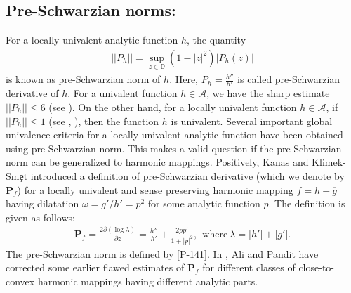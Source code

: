 \documentclass[a4paper,12pt]{amsart}
\theoremstyle{definition}
\newcounter {own}
\begin{document}
	
	

	
	\subsection{Pre-Schwarzian norms:}
	For a locally univalent analytic function $h$, the quantity 
	\begin{align}\label{P-141}
	||P_h|| = \sup_{z \in \mathbb{D}}(1-|z|^2)|P_h(z)|
	\end{align}
	is known as pre-Schwarzian norm of $h.$ Here, $P_h=\frac{h''}{h'}$ is called pre-Schwarzian derivative of $h.$ For a univalent function $h\in\mathcal{A}$, we have the sharp estimate $||P_h||\leq 6$ (see \cite{Kraus-1932}). On the other hand, for a locally univalent function $h\in\mathcal{A}$, if $||P_h||\leq 1$ (see \cite{Becker-1972}, \cite{Becker-Pommerenke-1984}), then the function $h$ is univalent.
	Several important global univalence criteria for a locally univalent analytic function have been obtained using pre-Schwarzian norm. This makes a valid question if the pre-Schwarzian norm can be generalized to harmonic mappings. Positively, Kanas and Klimek-Sm\c{e}t \cite{Kanas-Smet-2014} introduced a definition of pre-Schwarzian derivative (which we denote by $\mathbf{P}_f$) for a locally univalent and sense preserving harmonic mapping $f = h+\overline{g}$ having dilatation $\omega = g'/h'= p^2$ for some analytic function $p$. The definition is given as follows:
	\begin{align}\label{p1-020}
		\mathbf{P}_f= \frac{2\partial(\log\lambda)}{\partial z}= \frac{h''}{h'}+\frac{2\overline{p}p'}{1+|p|^2},~~\text{where}~\lambda = |h'|+|g'|.
	\end{align}
	The pre-Schwarzian norm is defined by \eqref{P-141}.  In \cite{Ali-Pandit-2023}, Ali and Pandit have corrected some earlier flawed estimates of $\mathbf{P}_f$ for different classes of close-to-convex harmonic mappings having different analytic parts. 
	
\end{document}
